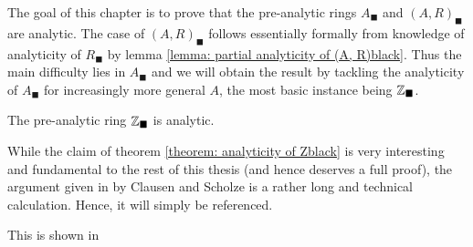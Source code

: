 The goal of this chapter is to prove that the pre-analytic rings $A_\blacksquare$ and $(A, R)_\blacksquare$ are analytic. The case of $(A, R)_\blacksquare$ follows essentially formally from knowledge of analyticity of $R_\blacksquare$ by lemma \ref{lemma: partial analyticity of (A, R)black}. Thus the main difficulty lies in $A_\blacksquare$ and we will obtain the result by tackling the analyticity of $A_\blacksquare$ for increasingly more general $A$, the most basic instance being ${\mathbb{Z}}_\blacksquare$.
\begin{theorem}
	\label{theorem: analyticity of Zblack}
	
	The pre-analytic ring ${\mathbb{Z}}_\blacksquare$ is analytic.
\end{theorem}
%	
%	
%	
While the claim of theorem \ref{theorem: analyticity of Zblack} is very interesting and fundamental to the rest of this thesis (and hence deserves a full proof), the argument given in \cite{condenseddotpdf} by Clausen and Scholze is a rather long and technical calculation. Hence, it will simply be referenced.
\begin{shortproof}
	This is shown in \cite[Lecture VI, pp. 38--41]{condenseddotpdf}
\end{shortproof}


